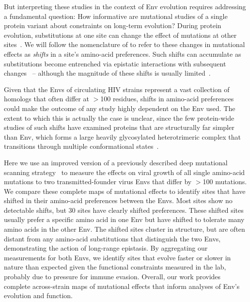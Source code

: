 \documentclass[9pt]{elife}
\begin{document}
But interpreting these studies in the context of Env evolution requires addressing a fundamental question: How informative are mutational studies of a single protein variant about constraints on long-term evolution?
During protein evolution, substitutions at one site can change the effect of mutations at other sites~\citep{natarajan2013epistasis,gong2013stability,harms2014historical,podgornaia2015pervasive,starr2016epistasis,klink2017parallel}.
We will follow the nomenclature of \citet{pollock2012amino} to refer to these changes in mutational effects as \emph{shifts} in a site's amino-acid preferences.
Such shifts can accumulate as substitutions become entrenched via epistatic interactions with subsequent changes~\citep{starr2017pervasive,pollock2012amino,shah2015contingency,bazykin2015changing} -- although the magnitude of these shifts is usually limited~\citep{doud2015site,chan2017correlation,ashenberg2013mutational,risso2014mutational}.

Given that the Envs of circulating HIV strains represent a vast collection of homologs that often differ at $>$100 residues, shifts in amino-acid preferences could make the outcome of any study highly dependent on the Env used.
The extent to which this is actually the case is unclear, since the few protein-wide studies of such shifts have examined proteins that are structurally far simpler than Env, which forms a large heavily glycosylated heterotrimeric complex that transitions through multiple conformational states~\citep{munro2014conformational,ozorowski2017open}.

Here we use an improved version of a previously described deep mutational scanning strategy~\citep{haddox2016experimental} to measure the effects on viral growth of all single amino-acid mutations to two transmitted-founder virus Envs that differ by $>$100 mutations.
We compare these complete maps of mutational effects to identify sites that have shifted in their amino-acid preferences between the Envs.
Most sites show no detectable shifts, but 30 sites have clearly shifted preferences.
These shifted sites usually prefer a specific amino acid in one Env but have shifted to tolerate many amino acids in the other Env.
The shifted sites cluster in structure, but are often distant from any amino-acid substitutions that distinguish the two Envs, demonstrating the action of long-range epistasis.
By aggregating our measurements for both Envs, we identify sites that evolve faster or slower in nature than expected given the functional constraints measured in the lab, probably due to pressure for immune evasion.
Overall, our work provides complete across-strain maps of mutational effects that inform analyses of Env's evolution and function.
\end{document}
